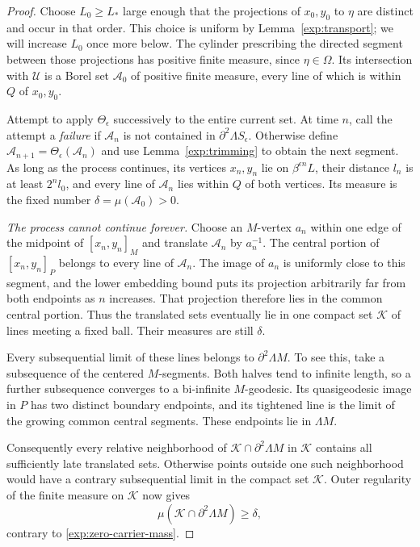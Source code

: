 \begin{proof}
Choose $L_0\ge L_*$ large enough that the projections of $x_0,y_0$
to $\eta$ are distinct and occur in that order. This choice is uniform
by Lemma~\ref{exp:transport}; we will increase $L_0$ once more below.
The cylinder prescribing the directed segment between those projections
has positive finite measure, since $\eta\in\Omega$. Its intersection
with $\mathcal U$ is a Borel set $\mathcal A_0$ of positive finite
measure, every line of which is within $Q$ of $x_0,y_0$.

Attempt to apply $\Theta_\epsilon$ successively to the entire
current set. At time $n$, call the attempt a \emph{failure} if
$\mathcal A_n$ is not contained in
$\partial^2\Lambda S_\epsilon$. Otherwise define
$\mathcal A_{n+1}=\Theta_\epsilon(\mathcal A_n)$ and use
Lemma~\ref{exp:trimming} to obtain the next segment. As long as
the process continues, its vertices $x_n,y_n$ lie on
$\beta^{\epsilon n}L$, their distance $l_n$ is at least
$2^n l_0$, and every line of $\mathcal A_n$ lies within $Q$ of
both vertices. Its measure is the fixed number
$\delta=\mu(\mathcal A_0)>0$.

\smallskip\noindent
\emph{The process cannot continue forever.}
Choose an $M$-vertex $a_n$ within one edge of the midpoint of
$[x_n,y_n]_M$ and
translate $\mathcal A_n$ by $a_n^{-1}$. The central portion of
$[x_n,y_n]_P$ belongs to every line of $\mathcal A_n$.
The image of $a_n$ is uniformly close to this segment, and the
lower embedding bound puts its projection arbitrarily far from
both endpoints as $n$ increases. That projection therefore lies
in the common central portion. Thus the translated sets
eventually lie in one compact set $\mathcal K$ of lines meeting a
fixed ball. Their measures are still $\delta$.

Every subsequential limit of these lines belongs to
$\partial^2\Lambda M$. To see this, take a subsequence of the
centered $M$-segments. Both halves tend to infinite length, so a
further subsequence converges to a bi-infinite $M$-geodesic. Its
quasigeodesic image in $P$ has two distinct boundary endpoints,
and its tightened line is the limit of the growing common central
segments. These endpoints lie in $\Lambda M$.

Consequently every relative neighborhood of
$\mathcal K\cap\partial^2\Lambda M$ in $\mathcal K$ contains
all sufficiently late translated sets. Otherwise points outside
one such neighborhood would have a contrary subsequential limit
in the compact set $\mathcal K$. Outer regularity of the finite
measure on $\mathcal K$ now gives
\[
 \mu(\mathcal K\cap\partial^2\Lambda M)\ge\delta,
\]
contrary to \eqref{exp:zero-carrier-mass}.


\end{proof}
